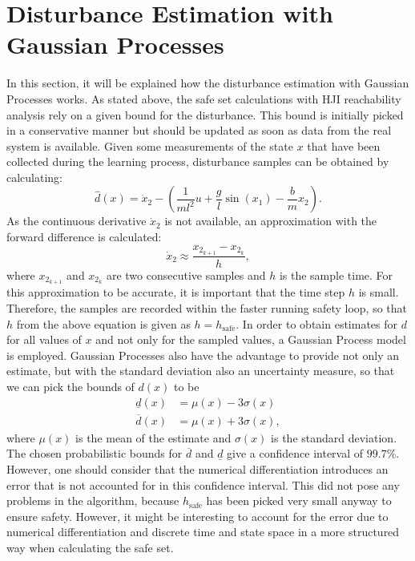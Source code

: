 \documentclass[../main.tex]{subfiles}
\begin{document}
\section{Disturbance Estimation with Gaussian Processes}\label{sec:implementation_GP}
In this section, it will be explained how the disturbance estimation with Gaussian Processes works. As stated above, the safe set calculations with HJI reachability analysis rely on a given bound for the disturbance. This bound is initially picked in a conservative manner but should be updated as soon as data from the real system is available. Given some measurements of the state $x$ that have been collected during the learning process, disturbance samples can be obtained by calculating:
\begin{equation}
    \hat{d}(x)=\dot{x}_2-\left(\frac{1}{ml^2}u+\frac{g}{l}\sin(x_1)-\frac{b}{m}x_2\right).
\end{equation}
As the continuous derivative $\dot{x}_2$ is not available, an approximation with the forward difference is calculated:
\begin{equation}
    \dot{x}_2 \approx \frac{x_{2_{k+1}}-x_{2_k}}{h},
\end{equation}
where $x_{2_{k+1}}$ and $x_{2_k}$ are two consecutive samples and $h$ is the sample time.
For this approximation to be accurate, it is important that the time step $h$ is small. Therefore, the samples are recorded within the faster running safety loop, so that $h$ from the above equation is given as $h = h_{\text{safe}}$.
In order to obtain estimates for $d$ for all values of $x$ and not only for the sampled values, a Gaussian Process model is employed. Gaussian Processes also have the advantage to provide not only an estimate, but with the standard deviation also an uncertainty measure, so that we can pick the bounds of $d(x)$ to be
\begin{align}
    \underline{d}(x) &= \mu(x)-3\sigma(x)\\
    \overline{d}(x) &= \mu(x)+3\sigma(x),
\end{align}
where $\mu(x)$ is the mean of the estimate and $\sigma(x)$ is the standard deviation. The chosen  probabilistic bounds for $\overline{d}$ and $\underline{d}$ give a confidence interval of $99.7\%$. However, one should consider that the numerical differentiation introduces an error that is not accounted for in this confidence interval. This did not pose any problems in the algorithm, because $h_{\text{safe}}$ has been picked very small anyway to ensure safety. However, it might be interesting to account for the error due to numerical differentiation and discrete time and state space in a more structured way when calculating the safe set. \par
\end{document}
